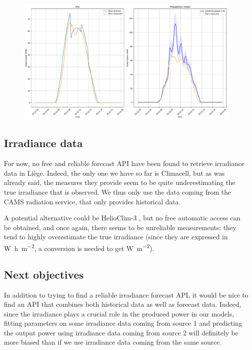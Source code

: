 \documentclass[a4paper, 12pt]{article}
\begin{document}
    \begin{figure}[H]
        \centering
        \includegraphics[width=\textwidth]{resources/pdf/bad_elia_post.pdf}
        \label{fig:bad_elia_post}
    \end{figure}
    
	\subsection{Irradiance data}

	For now, no free and reliable forecast API have been found to retrieve irradiance data in Liège. Indeed, the only one we have so far is Climacell, but as was already said, the measures they provide seem to be quite underestimating the true irradiance that is observed. We thus only use the data coming from the CAMS radiation service, that only provides historical data.
	
	A potential alternative could be HelioClim-3 \cite{helioclim}, but no free automatic access can be obtained, and once again, there seems to be unreliable measurements: they tend to highly overestimate the true irradiance (since they are expressed in \si{\watt\hour\per\meter\squared}, a conversion is needed to get \si{\watt\per\meter\squared}).

	\subsection{Next objectives}

	In addition to trying to find a reliable irradiance forecast API, it would be nice to find an API that combines both historical data as well as forecast data. Indeed, since the irradiance plays a crucial role in the produced power in our models, fitting parameters on some irradiance data coming from source 1 and predicting the output power using irradiance data coming from source 2 will definitely be more biased than if we use irradiance data coming from the same source.
	
\end{document}
